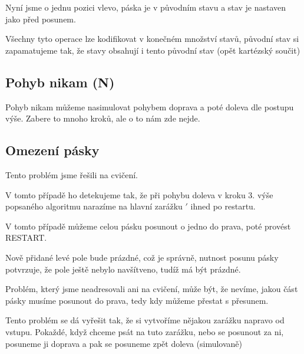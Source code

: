 \documentclass{article}
\begin{document}
Nyní jsme o jednu pozici vlevo, páska je v původním stavu a stav je nastaven jako před posunem.

Všechny tyto operace lze kodifikovat v konečném množství stavů, původní stav si zapamatujeme tak, že stavy obsahují i tento původní stav (opět kartézský součit)

\subsection{Pohyb nikam (N)} 

Pohyb nikam můžeme nasimulovat pohybem doprava a poté doleva dle postupu výše. Zabere to mnoho kroků, ale o to nám zde nejde.

\subsection{Omezení pásky}

Tento problém jsme řešili na cvičení.

V tomto případě ho detekujeme tak, že při pohybu doleva v kroku 3. výše popsaného algoritmu narazíme na hlavní zarážku $\prime$ ihned po restartu.

V tomto případě můžeme celou pásku posunout o jedno do prava, poté provést RESTART.

Nově přidané levé pole bude prázdné, což je správně, nutnost posunu pásky potvrzuje, že pole ještě nebylo navšítveno, tudíž má být prázdné.

Problém, který jsme neadresovali ani na cvičení, může být, že nevíme, jakou část pásky musíme posunout do prava, tedy kdy můžeme přestat s přesunem.

Tento problém se dá vyřešit tak, že si vytvoříme nějakou zarážku napravo od vstupu. Pokaždé, když chceme psát na tuto zarážku, nebo se posunout za ni, posuneme ji doprava a pak se posuneme zpět doleva (simulovaně)
\end{document}
